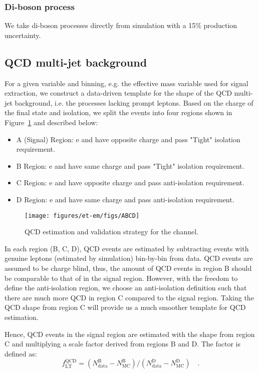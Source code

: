 \subsubsection{Di-boson process}
We take di-boson processes directly from simulation with a 15\% production uncertainty.

    
\subsection{QCD multi-jet background}\label{sec:etau_qcd}
For a given variable and binning, e.g. the effective mass variable
used for signal extraction, we construct a data-driven template for
the shape of the QCD multi-jet background, i.e. the processes lacking
prompt leptons.  Based on the charge of the final state and \tauh isolation,
we split the events into four regions shown in Figure~\ref{fig:ABCD} and 
described below:
\begin{itemize}
  \item A (Signal) Region: e and \tauh have opposite charge and \tauh pass "Tight" isolation requirement.
  \item B Region: e and \tauh have same charge and \tauh pass "Tight" isolation requirement.
  \item C Region: e and \tauh have opposite charge and \tauh pass anti-isolation requirement.
  \item D Region: e and \tauh have same charge and \tauh pass anti-isolation requirement.
\end{itemize}

\begin{figure}\centering
  \texttt{[image: figures/et-em/figs/ABCD]}
  \caption{\label{fig:ABCD} QCD estimation and validation strategy for the \teth channel.}
\end{figure}
In each region (B, C, D), QCD events are estimated by subtracting events
with genuine leptons (estimated by simulation) bin-by-bin from data.
QCD events are assumed to be charge blind, thus, the amount of QCD events in region B should be 
comparable to that of in the signal region. However, with the freedom to define the
anti-isolation region, we choose an anti-isolation definition such
that there are much more QCD in region C compared to the signal region. 
Taking the QCD shape from region C will provide us 
a much smoother template for QCD estimation.

Hence, QCD events in the signal region are estimated with the shape from region C 
and multiplying a scale factor derived from regions B and D. The factor is defined as:
\begin{equation}\label{eq:et_qcd_sf}
f_\mathrm{LT}^\mathrm{QCD} = \left(N_\mathrm{data}^\mathrm{B} - N_\mathrm{MC}^\mathrm{B}\right)
/ \left(N_\mathrm{data}^\mathrm{D} -
N_\mathrm{MC}^\mathrm{D}\right)\quad.
\end{equation}

